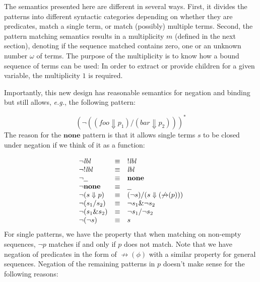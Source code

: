 \documentclass{article}
\newcommand{\lbl}{\ensuremath{\mathit{lbl}}}
\newcommand{\por}[2]{\ensuremath{#1/#2}}
\newcommand{\pand}[2]{\ensuremath{#1\&#2}}
\newcommand{\children}[2]{\ensuremath{#1} \Downarrow #2}
\newcommand{\pnot}[1]{\ensuremath{\lnot #1}}
\newcommand{\many}[1]{\ensuremath{#1^*}}
\newcommand{\any}{\ensuremath{\text{\underline{\hspace{0.6em}}}}}
\newcommand{\none}{\ensuremath{\mathbf{none}}}
\newcommand{\nfb}[1]{\ensuremath{\mathop{\not\rightarrow}(#1)}}
\begin{document}
%
The semantics presented here are different in several ways. First,
it divides the patterns into different syntactic categories
depending on whether they are predicates, match a single term, or
match (possibly) multiple terms. Second, the pattern matching
semantics results in a multiplicity $m$ (defined in the next
section), denoting if the sequence matched contains zero, one or
an unknown number $\omega$ of terms.
%
The purpose of the multiplicity is to know how a bound sequence of
terms can be used: In order to extract or provide children for a
given variable, the multiplicity $1$ is required.

Importantly, this new design has reasonable semantics for negation
and binding but still allows, \emph{e.g.}, the following pattern:

\[
\many{(\pnot{(\por{(\children{\mathit{foo}}{p_1})}{(\children{\mathit{bar}}{p_2})})})}
\]
%
%
The reason for the \none{} pattern is that it allows single terms
$s$ to be closed under negation if we think of it as a function:

\[
  \begin{array}{lcl}
    \pnot{\lbl}              & \equiv & !\lbl\\
    \pnot{!\lbl}             & \equiv & \lbl\\
    \pnot{\any}              & \equiv & \none{}\\
    \pnot{\none}             & \equiv & \any{}\\
    \pnot{(\children{s}{p})} & \equiv & \por{(\pnot s)}{(\children{s}{(\nfb{p})})}\\
    \pnot{(\por{s_1}{s_2})}  & \equiv & \pand{\pnot s_1}{\pnot s_2}\\
    \pnot{(\pand{s_1}{s_2})} & \equiv & \por{\pnot s_1}{\pnot s_2}\\
    \pnot(\pnot{s})          & \equiv & s\\
  \end{array}
\]
%
For single patterns, we have the property that when matching on
non-empty sequences, $\pnot{p}$ matches if and only if $p$ does
not match.
%
Note that we have negation of predicates in the form of
$\nfb{\phi}$ with a similar property for general sequences.
%
Negation of the remaining patterns in $p$ doesn't
make sense for the following reasons:
\end{document}
